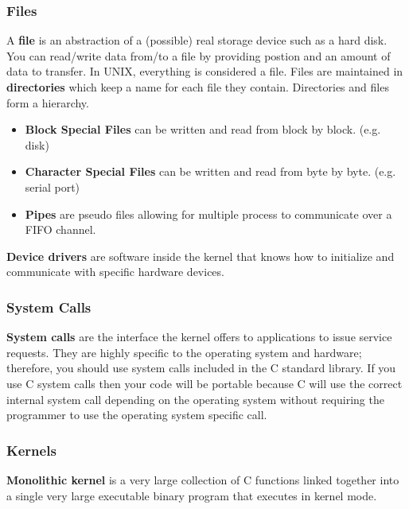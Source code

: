 \documentclass{article}
\newcommand{\newlist}{\begin{itemize}}
\renewcommand{\endlist}{\end{itemize}}
\begin{document}
    \subsubsection{Files}

    \noindent A \textbf{file} is an abstraction of a (possible) real storage device such as a hard disk. You can read/write data from/to a file by providing postion and an amount of data to transfer. In UNIX, everything is considered a file. Files are maintained in \textbf{directories} which keep a name for each file they contain. Directories and files form a hierarchy. 

    \newlist

\item \textbf{Block Special Files} can be written and read from block by block. (e.g. disk)

\item \textbf{Character Special Files} can be written and read from byte by byte. (e.g. serial port)

\item \textbf{Pipes} are pseudo files allowing for multiple process to communicate over a FIFO channel. 

    \endlist

    \noindent \textbf{Device drivers} are software inside the kernel that knows how to initialize and communicate with specific hardware devices. 

    \subsubsection{System Calls}

    \textbf{System calls} are the interface the kernel offers to applications to issue service requests. They are highly specific to the operating system and hardware; therefore, you should use system calls included in the C standard library. If you use C system calls then your code will be portable because C will use the correct internal system call depending on the operating system without requiring the programmer to use the operating system specific call. 

    \subsubsection{Kernels}

    \textbf{Monolithic kernel} is a very large collection of C functions linked together into a single very large executable binary program that executes in kernel mode.
\end{document}
